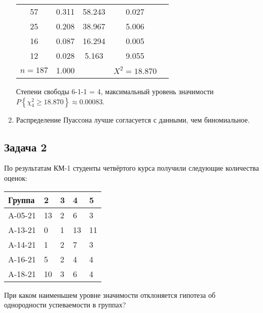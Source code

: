 \documentclass[a4paper,12pt]{article}
\newcommand{\probability}[1]{P \left\{ #1 \right\}}
\begin{document}
\begin{enumerate}
\begin{tabular}{|c|c|c|c|c|}
                  57        & 0.311           & 58.243            & 0.027                                               \\
                  25        & 0.208           & 38.967            & 5.006                                               \\
                  16        & 0.087           & 16.294            & 0.005                                               \\
                  12        & 0.028           & 5.163             & 9.055                                               \\
                  \hline
                  $n = 187$ & 1.000           &                   & $X^2 = 18.870$                                      \\
                  \hline
              \end{tabular}

              Степени свободы 6-1-1 = 4, максимальный уровень значимости $\probability{\chi_4^2 \ge 18.870} \approx 0.00083$.

        \item Распределение Пуассона лучше согласуется с данными, чем биномиальное.
    \end{enumerate}
\fi

\subsection*{Задача 2}

По результатам КМ-1 студенты четвёртого курса получили следующие количества оценок:

\begin{center}
    \begin{tabular}{|P{2cm}|P{1cm}|P{1cm}|P{1cm}|P{1cm}|}
        \hline
        Группа  & 2  & 3 & 4  & 5  \\
        \hline
        A-05-21 & 13 & 2 & 6  & 3  \\
        \hline
        A-13-21 & 0  & 1 & 13 & 11 \\
        \hline
        A-14-21 & 1  & 2 & 7  & 3  \\
        \hline
        A-16-21 & 5  & 2 & 4  & 4  \\
        \hline
        A-18-21 & 10 & 3 & 6  & 4  \\
        \hline
    \end{tabular}
\end{center}

При каком наименьшем уровне значимости отклоняется гипотеза об однородности успеваемости в группах?
\end{document}
